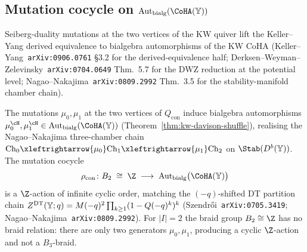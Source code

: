 \subsection{Mutation cocycle on $\mathrm{Aut}_{\mathrm{bialg}}(\CoHA(\bY))$}
\label{subsec:kw-mutation-cocycle}

Seiberg-duality mutations at the two vertices of the KW quiver lift the Keller--Yang derived equivalence to bialgebra automorphisms of the KW CoHA (Keller--Yang~\texttt{arXiv:0906.0761} \S3.2 for the derived-equivalence half; Derksen--Weyman--Zelevinsky~\texttt{arXiv:0704.0649} Thm.~5.7 for the DWZ reduction at the potential level; Nagao--Nakajima~\texttt{arXiv:0809.2992} Thm.~3.5 for the stability-manifold chamber chain).

\begin{theorem}
\label{thm:kw-mutation-cocycle}
The mutations $\mu_0, \mu_1$ at the two vertices of $Q_{\mathrm{con}}$ induce bialgebra automorphisms $\mu_0^{\cH}, \mu_1^{\cH} \in \mathrm{Aut}_{\mathrm{bialg}}(\CoHA(\bY))$ (Theorem~\ref{thm:kw-davison-shuffle}), realising the Nagao--Nakajima three-chamber chain $\mathrm{Ch}_0 \xleftrightarrow{\mu_0} \mathrm{Ch}_1 \xleftrightarrow{\mu_1} \mathrm{Ch}_2$ on $\Stab(D^b(\bY))$. The mutation cocycle
\[
 \rho_{\mathrm{con}} \colon B_2 \;\cong\; \Z
 \;\longrightarrow\; \mathrm{Aut}_{\mathrm{bialg}}\bigl(\CoHA(\bY)\bigr)
\]
is a $\Z$-action of infinite cyclic order, matching the $(-q)$-shifted DT partition chain $Z^{\mathrm{DT}}(\mathbb{Y}; q) = M(-q)^2 \prod_{k \geq 1}(1 - Q(-q)^k)^k$ (Szendr\H{o}i~\texttt{arXiv:0705.3419}; Nagao--Nakajima~\texttt{arXiv:0809.2992}). For $|I| = 2$ the braid group $B_2 \cong \Z$ has no braid relation: there are only two generators $\mu_0, \mu_1$, producing a cyclic $\Z$-action and not a $B_3$-braid.
\end{theorem}

